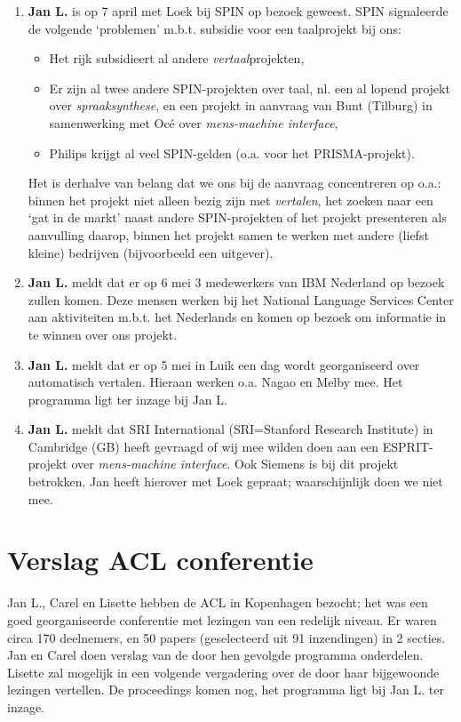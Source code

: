 \begin{enumerate}
  \item {\bf Jan L.} is op 7 april met Loek bij SPIN op bezoek geweest. SPIN 
signaleerde de volgende `problemen' m.b.t. subsidie voor een taalprojekt bij 
ons:
   \begin{itemize}
      \item Het rijk subsidieert al andere {\em vertaal}projekten,
      \item Er zijn al twee andere SPIN-projekten over taal, nl. een al lopend 
projekt over {\em spraaksynthese}, en een projekt in aanvraag van Bunt 
(Tilburg) in samenwerking met Oc\'{e} over {\em mens-machine interface},
      \item Philips krijgt al veel SPIN-gelden (o.a. voor het PRISMA-projekt).
   \end{itemize}
Het is derhalve van belang dat we ons bij de aanvraag concentreren op o.a.: 
binnen het projekt 
niet alleen bezig zijn met {\em vertalen}, het zoeken naar een `gat in de 
markt' naast andere SPIN-projekten of het projekt presenteren als aanvulling 
daarop, binnen het projekt samen te werken met andere (liefst kleine) bedrijven
(bijvoorbeeld een uitgever).
  \item {\bf Jan L.} meldt dat er op 6 mei 3 medewerkers van IBM Nederland op 
bezoek zullen komen. Deze mensen werken bij het National Language Services 
Center aan aktiviteiten m.b.t. het Nederlands en komen op bezoek om informatie 
in te winnen over ons projekt.
  \item {\bf Jan L.} meldt dat er op 5 mei in Luik een dag wordt georganiseerd 
over automatisch vertalen. Hieraan werken o.a. Nagao en Melby mee. Het 
programma ligt ter inzage bij Jan L.
  \item {\bf Jan L.} meldt dat SRI International (SRI=Stanford Research 
Institute) in Cambridge (GB) heeft gevraagd of wij mee wilden doen aan een 
ESPRIT-projekt over {\em mens-machine interface}. Ook Siemens is bij dit 
projekt betrokken. Jan heeft hierover met Loek gepraat; waarschijnlijk doen we 
niet mee.
\end{enumerate}

\section {Verslag ACL conferentie}

Jan L., Carel en Lisette hebben de ACL in Kopenhagen bezocht; het was een goed 
georganiseerde conferentie met lezingen van een redelijk niveau. Er waren circa 
170 deelnemers, en 50 papers (geselecteerd uit 91 inzendingen) in 2 secties. 
Jan en Carel doen verslag van de door hen gevolgde programma onderdelen. 
Lisette zal mogelijk in een volgende vergadering over de door haar bijgewoonde 
lezingen vertellen. De proceedings komen nog, het programma ligt bij Jan L. 
ter inzage.

